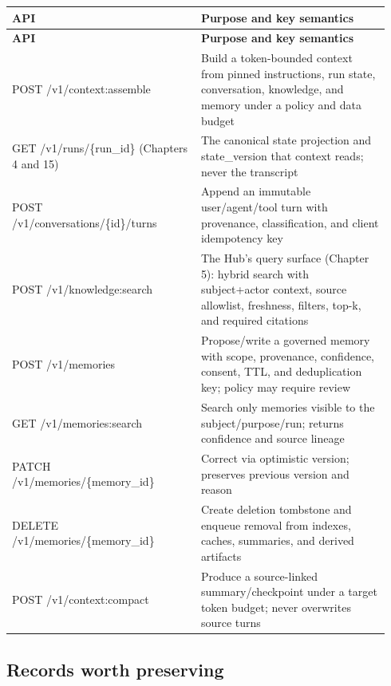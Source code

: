 \BookTableStart
\small
\begin{longtable}{@{}Y{0.4700\linewidth}Y{0.4700\linewidth}@{}}
\color{white}\bfseries \textbf{API} & \color{white}\bfseries \textbf{Purpose and key semantics} \\
\endfirsthead
{}
\color{white}\bfseries \textbf{API} & \color{white}\bfseries \textbf{Purpose and key semantics} \\
\endhead
POST /v1/context:assemble & Build a token-bounded context from pinned instructions, run state, conversation, knowledge, and memory under a policy and data budget \\
GET /v1/runs/\{run\_id\} (Chapters 4 and 15) & The canonical state projection and state\_version that context reads; never the transcript \\
POST /v1/conversations/\{id\}/turns & Append an immutable user/agent/tool turn with provenance, classification, and client idempotency key \\
POST /v1/knowledge:search & The Hub's query surface (Chapter 5): hybrid search with subject+actor context, source allowlist, freshness, filters, top-k, and required citations \\
POST /v1/memories & Propose/write a governed memory with scope, provenance, confidence, consent, TTL, and deduplication key; policy may require review \\
GET /v1/memories:search & Search only memories visible to the subject/purpose/run; returns confidence and source lineage \\
PATCH /v1/memories/\{memory\_id\} & Correct via optimistic version; preserves previous version and reason \\
DELETE /v1/memories/\{memory\_id\} & Create deletion tombstone and enqueue removal from indexes, caches, summaries, and derived artifacts \\
POST /v1/context:compact & Produce a source-linked summary/checkpoint under a target token budget; never overwrites source turns \\
\end{longtable}
\BookTableEnd

\subsection{Records worth preserving}

